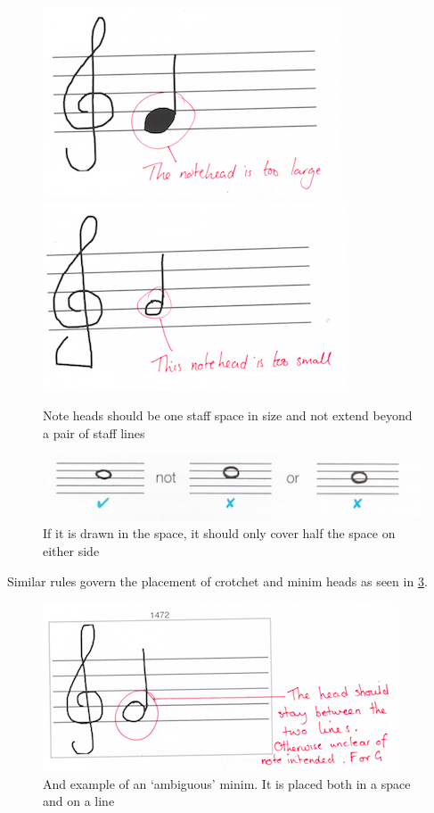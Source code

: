 \begin{figure}[H]
  \centering
  \includegraphics[width=.4\linewidth]{gfx/teacher-notes/mistake-notehead-too-big.png}
  \includegraphics[width=.4\linewidth]{gfx/teacher-notes/mistake-notehead-too-small.png}
  \caption{Note heads should be one staff space in size and not extend beyond a pair of staff lines}
  \label{fig:mistake-note-ambig}
\end{figure}

\begin{figure}[h!]
  \centering
  \includegraphics[width=\linewidth]{gfx/basic/semibreve-on-space.png}
  \caption{If it is drawn in the space, it should only cover half the space on either side}
  \label{fig:semibreve-on-space}
\end{figure}

Similar rules govern the placement of crotchet and minim heads as seen in \cref{fig:mistake-note-ambig}.

\begin{figure}[H]
  \centering
  \includegraphics[width=.6\linewidth]{gfx/teacher-notes/mistake-notehead-ambiguous.png}
  \caption{And example of an `ambiguous' minim. It is placed both in a space and on a line}
  \label{fig:mistake-note-ambig}
\end{figure}

